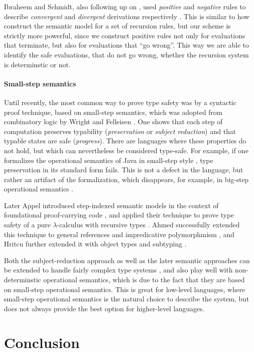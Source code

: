\documentclass[a4paper,final,preprint,sort&compress]{elsarticle}
\begin{document}
Ibraheem and Schmidt, also following up on \cite{CousotCousot92}, used \emph{positive} and
\emph{negative} rules to describe \emph{convergent} and \emph{divergent} derivations respectively
\cite{IbraheemSchmidt98}. This is similar to how construct the semantic model for
a set of recursion rules, but our scheme is strictly more powerful, since we construct positive
rules not only for evaluations that terminate, but also for evaluations that ``go wrong''. This
way we are able to identify the safe evaluations, that do not go wrong, whether the recursion
system is determinstic or not.


\paragraph{Small-step semantics}

Until recently, the most common way to prove type safety was by a syntactic proof
technique, based on small-step semantics, which was adopted from combinatory
logic by Wright and Felleisen \cite{WrightFelleisen94}. One shows that each step of
computation preserves typability (\emph{preservation} or \emph{subject reduction})
and that typable states are safe (\emph{progress}). There are
languages where these properties do not hold, but which can nevertheless be
considered type-safe. For example, if one formalizes the operational semantics
of Java in small-step style \cite{FlattKrishnamurthiFelleisen98,IgarashiPierceWadler01},
type preservation in its standard form fails. This is
not a defect in the language, but rather an artifact of the formalization, which
disappears, for example, in big-step operational semantics \cite{Pierce02}.

Later Appel \ETAL introduced step-indexed semantic models in the context of
foundational proof-carrying code \cite{AppelFelty00}, and applied their technique
to prove type safety of a pure $\lambda$-calculus with recursive types
\cite{AppelMcAllester01}. Ahmed \ETAL successfully extended this technique to
general references and impredicative polymorphmism \cite{AhmedAppelVirga02,Ahmed04},
and Hritcu \ETAL further extended it with object types and subtyping
\cite{Hritcu07,HritcuSchwinghammer09}.

Both the subject-reduction approach as well as the later semantic approaches
can be extended to handle fairly complex type systems \cite{Pierce02}, and also play well with
non-determinstic operational semantics, which is due to the fact that they are
based on small-step operational semantics. This is great for low-level languages,
where small-step operational semantics is the natural choice to describe the
system, but does not always provide the best option for higher-level languages.



\section{Conclusion}
\label{sec:Conclusion}






\end{document}
